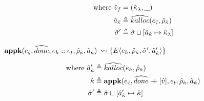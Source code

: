\documentclass[12pt,draft]{article}
\newcommand\mdoubleplus{\ensuremath{\mathbin{+\mkern-9mu+}}}
\newcommand{\E}[4]{E\langle #1 , #2 , #3 , #4 \rangle}
\begin{document}
\begin{multicols*}{2}
\vspace{-7mm}
\begin{align*}
  \text{where }
  \hat{v}_f &= (\hat{\kappa}_{\lambda} , \_) \\
  \hat{a}_{\hat{\kappa}} &\triangleq \widehat{kalloc}(e_{\hat{\varsigma}} , \hat{\rho}_{\hat{\kappa}}) \\
  \hat{\sigma}' &\triangleq \hat{\sigma} \sqcup [\hat{a}_{\hat{\kappa}} \mapsto \hat{\kappa}_{\lambda}]
\end{align*}
\begin{center}
  $\textbf{appk}(e_{\hat{\varsigma}} , \widehat{done} , e_h::e_t , \hat{\rho}_{\hat{\kappa}} , \hat{a}_{\hat{\kappa}})$
  $\leadsto \{\E{e_h}{\aenv_{\akont}}{\astore'}{\akaddr'}\}$
\end{center}
\vspace{-7mm}
\begin{align*}
  \text{where }
  \akaddr' &\triangleq \akalloc{e_h , \aenv_{\akont}} \\
  \akont &\triangleq \textbf{appk}(\ectrl, \adone \mdoubleplus [\aval],
            e_t , \aenv_{\akont} , \akaddr) \\
  \astore' &\triangleq \astore \sqcup [\akaddr' \mapsto \akont]
\end{align*}
\end{multicols*}
\end{document}
